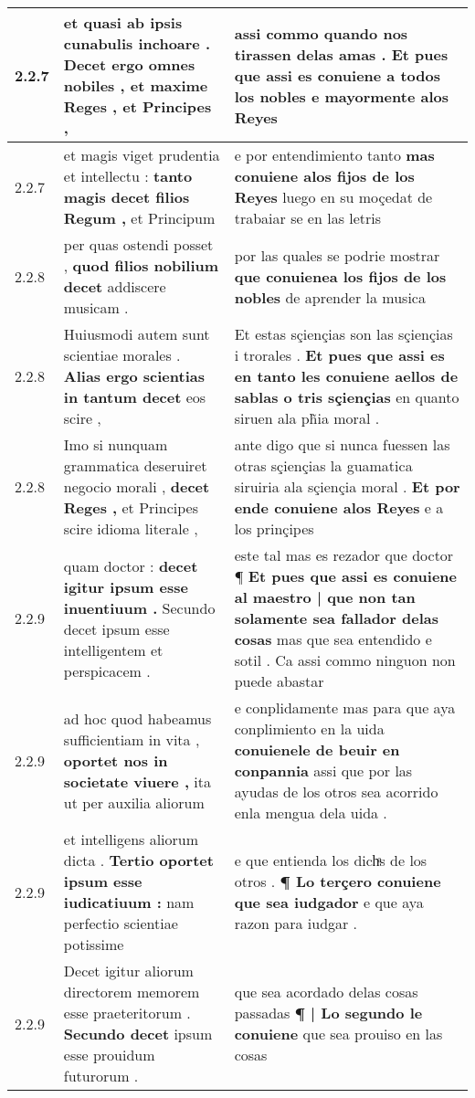 \begin{tabular}{|p{1cm}|p{6.5cm}|p{6.5cm}|}
2.2.7 & et quasi ab ipsis cunabulis inchoare . \textbf{ Decet ergo omnes nobiles , } et maxime Reges , et Principes , & assi commo quando nos tirassen delas amas . \textbf{ Et pues que assi es conuiene a todos los nobles } e mayormente alos Reyes \\\hline
2.2.7 & et magis viget prudentia et intellectu : \textbf{ tanto magis decet filios Regum , } et Principum & e por entendimiento tanto \textbf{ mas conuiene alos fijos de los Reyes } luego en su moçedat de trabaiar se en las letris \\\hline
2.2.8 & per quas ostendi posset , \textbf{ quod filios nobilium decet } addiscere musicam . & por las quales se podrie mostrar \textbf{ que conuienea los fijos de los nobles } de aprender la musica \\\hline
2.2.8 & Huiusmodi autem sunt scientiae morales . \textbf{ Alias ergo scientias in tantum decet } eos scire , & Et estas sçiençias son las sçiençias i trorales . \textbf{ Et pues que assi es en tanto les conuiene aellos de sablas o tris sçiençias } en quanto siruen ala ph̃ia moral . \\\hline
2.2.8 & Imo si nunquam grammatica deseruiret negocio morali , \textbf{ decet Reges , } et Principes scire idioma literale , & ante digo que si nunca fuessen las otras sçiençias la guamatica siruiria ala sçiençia moral . \textbf{ Et por ende conuiene alos Reyes } e a los prinçipes \\\hline
2.2.9 & quam doctor : \textbf{ decet igitur ipsum esse inuentiuum . } Secundo decet ipsum esse intelligentem et perspicacem . & este tal mas es rezador que doctor ¶ \textbf{ Et pues que assi es conuiene al maestro | que non tan solamente sea fallador delas cosas } mas que sea entendido e sotil . Ca assi commo ninguon non puede abastar \\\hline
2.2.9 & ad hoc quod habeamus sufficientiam in vita , \textbf{ oportet nos in societate viuere , } ita ut per auxilia aliorum & e conplidamente mas para que aya conplimiento en la uida \textbf{ conuienele de beuir en conpannia } assi que por las ayudas de los otros sea acorrido enla mengua dela uida . \\\hline
2.2.9 & et intelligens aliorum dicta . \textbf{ Tertio oportet ipsum esse iudicatiuum : } nam perfectio scientiae potissime & e que entienda los dichͣs de los otros . \textbf{ ¶ Lo terçero conuiene que sea iudgador } e que aya razon para iudgar . \\\hline
2.2.9 & Decet igitur aliorum directorem memorem esse praeteritorum . \textbf{ Secundo decet } ipsum esse prouidum futurorum . & que sea acordado delas cosas passadas \textbf{ ¶ | Lo segundo le conuiene } que sea prouiso en las cosas \\\hline

\end{tabular}
